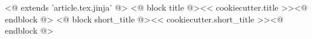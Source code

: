 <@ extends 'article.tex.jinja' @>
<@ block title @><< cookiecutter.title >><@ endblock @>
<@ block short_title @><< cookiecutter.short_title >><@ endblock @>